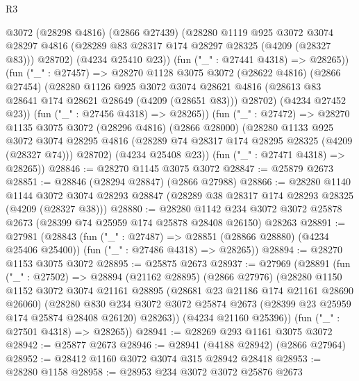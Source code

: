 \begin{lexlean}{R3}
\begin{coremodule}
            @3072
            (@28298 @4816)
            (@2866 @27439)
            (@28280
              @1119
              @925
              @3072
              @3074
              @28297
              @4816
              (@28289 @83 @28317 @174 @28297 @28325 (@4209 (@28327 @83)))
              @28702)
            (@4234 @25410 @23))
          (fun ("_" : @27441 @4318) => @28265))
        (fun ("_" : @27457) =>
        @28270
          @1128
          @3075
          @3072
          (@28622 @4816)
          (@2866 @27454)
          (@28280
            @1126
            @925
            @3072
            @3074
            @28621
            @4816
            (@28613 @83 @28641 @174 @28621 @28649 (@4209 (@28651 @83)))
            @28702)
          (@4234 @27452 @23))
        (fun ("_" : @27456 @4318) => @28265))
      (fun ("_" : @27472) =>
      @28270
        @1135
        @3075
        @3072
        (@28296 @4816)
        (@2866 @28000)
        (@28280
          @1133
          @925
          @3072
          @3074
          @28295
          @4816
          (@28289 @74 @28317 @174 @28295 @28325 (@4209 (@28327 @74)))
          @28702)
        (@4234 @25408 @23))
      (fun ("_" : @27471 @4318) => @28265))
@28846 := @28270 @1145 @3075 @3072
@28847 := @25879 @2673
@28851 := @28846 (@28294 @28847) (@2866 @27988)
@28866 := @28280
    @1140
    @1144
    @3072
    @3074
    @28293
    @28847
    (@28289 @38 @28317 @174 @28293 @28325 (@4209 (@28327 @38)))
@28880 := @28280
    @1142
    @234
    @3072
    @3072
    @25878
    @2673
    (@28399 @74 @25959 @174 @25878 @28408 @26150)
    @28263
@28891 := @27981
    (@28843
      (fun ("_" : @27487) => @28851 (@28866 @28880) (@4234 @25406 @25400))
      (fun ("_" : @27486 @4318) => @28265))
@28894 := @28270 @1153 @3075 @3072
@28895 := @25875 @2673
@28937 := @27969
    (@28891
      (fun ("_" : @27502) =>
      @28894
        (@21162 @28895)
        (@2866 @27976)
        (@28280
          @1150
          @1152
          @3072
          @3074
          @21161
          @28895
          (@28681 @23 @21186 @174 @21161 @28690 @26060)
          (@28280
            @830
            @234
            @3072
            @3072
            @25874
            @2673
            (@28399 @23 @25959 @174 @25874 @28408 @26120)
            @28263))
        (@4234 @21160 @25396))
      (fun ("_" : @27501 @4318) => @28265))
@28941 := @28269 @293 @1161 @3075 @3072
@28942 := @25877 @2673
@28946 := @28941 (@4188 @28942) (@2866 @27964)
@28952 := @28412 @1160 @3072 @3074 @315 @28942 @28418
@28953 := @28280 @1158
@28958 := @28953 @234 @3072 @3072 @25876 @2673

\end{coremodule}
\end{lexlean}
